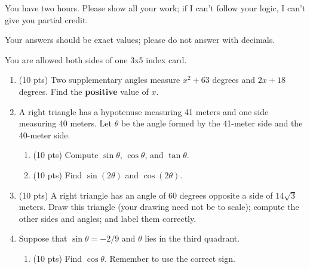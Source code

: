 \documentclass{handout}
\begin{document}
\maketitle

You have two hours. Please show all your work; if I can't follow your logic, I can't give you partial credit.

Your answers should be exact values; please do not answer with decimals.

You are allowed both sides of one 3x5 index card. 

\begin{enumerate}
  \item (10 pts) Two supplementary angles measure \(x^2 + 63\) degrees and \(2x + 18\) degrees. Find the \textbf{positive} value of \(x.\)

    \vspace{20em}

  \item A right triangle has a hypotenuse measuring 41 meters and one side measuring 40 meters. Let \(\theta\) be the angle formed by the 41-meter side and the 40-meter side.
    \begin{enumerate}
      \item (10 pts) Compute \(\sin \theta\), \(\cos \theta\), and \(\tan \theta.\)
        
        \vspace{10em}

      \item (10 pts) Find \(\sin(2\theta)\) and \(\cos(2\theta).\)

        \vspace{20em}
    \end{enumerate}

  \item (10 pts) A right triangle has an angle of 60 degrees opposite a side of \(14\sqrt3\) meters. Draw this triangle (your drawing need not be to scale); compute the other sides and angles; and label them correctly.

  \vspace{20em}

  \item Suppose that \(\sin \theta = -2/9\) and \(\theta\) lies in the third quadrant.
    \begin{enumerate}
      \item (10 pts) Find \(\cos \theta\). Remember to use the correct sign.

        \vspace{15em}


\end{enumerate}
\end{enumerate}
\end{document}

